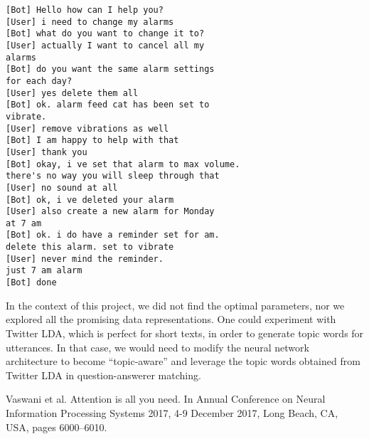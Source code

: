 \documentclass[10pt, twocolumn, a4paper]{article}
\begin{document}
\begin{verbatim}
[Bot] Hello how can I help you?
[User] i need to change my alarms
[Bot] what do you want to change it to?
[User] actually I want to cancel all my 
alarms
[Bot] do you want the same alarm settings 
for each day?
[User] yes delete them all
[Bot] ok. alarm feed cat has been set to
vibrate.
[User] remove vibrations as well
[Bot] I am happy to help with that
[User] thank you
[Bot] okay, i ve set that alarm to max volume.
there's no way you will sleep through that
[User] no sound at all
[Bot] ok, i ve deleted your alarm
[User] also create a new alarm for Monday 
at 7 am
[Bot] ok. i do have a reminder set for am. 
delete this alarm. set to vibrate
[User] never mind the reminder. 
just 7 am alarm
[Bot] done
\end{verbatim}


In the context of this project, we did not find the optimal parameters, nor we explored all the promising data representations. One could experiment with Twitter LDA, which is perfect for short texts, in order to generate topic words for utterances. In that case, we would need to modify the neural network architecture to become “topic-aware” and leverage the topic words obtained from Twitter LDA in question-answerer matching. 
 

\begin{thebibliography}{5}  

 Vaswani et al. Attention is all you need. In Annual Conference on Neural Information Processing Systems 2017, 4-9 December 2017, Long Beach, CA, USA, pages 6000–6010.

\end{thebibliography}
 
\end{document}
